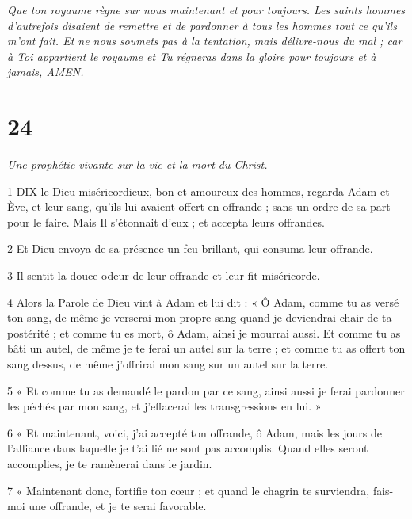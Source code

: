 \par \textit{Que ton royaume règne sur nous maintenant et pour toujours. Les saints hommes d’autrefois disaient de remettre et de pardonner à tous les hommes tout ce qu’ils m’ont fait. Et ne nous soumets pas à la tentation, mais délivre-nous du mal ; car à Toi appartient le royaume et Tu régneras dans la gloire pour toujours et à jamais, AMEN.}

\chapter{24}

\par \textit{Une prophétie vivante sur la vie et la mort du Christ.}

\par 1 DIX le Dieu miséricordieux, bon et amoureux des hommes, regarda Adam et Ève, et leur sang, qu'ils lui avaient offert en offrande ; sans un ordre de sa part pour le faire. Mais Il s’étonnait d’eux ; et accepta leurs offrandes.

\par 2 Et Dieu envoya de sa présence un feu brillant, qui consuma leur offrande.

\par 3 Il sentit la douce odeur de leur offrande et leur fit miséricorde.

\par 4 Alors la Parole de Dieu vint à Adam et lui dit : « Ô Adam, comme tu as versé ton sang, de même je verserai mon propre sang quand je deviendrai chair de ta postérité ; et comme tu es mort, ô Adam, ainsi je mourrai aussi. Et comme tu as bâti un autel, de même je te ferai un autel sur la terre ; et comme tu as offert ton sang dessus, de même j'offrirai mon sang sur un autel sur la terre.

\par 5 « Et comme tu as demandé le pardon par ce sang, ainsi aussi je ferai pardonner les péchés par mon sang, et j'effacerai les transgressions en lui. »

\par 6 « Et maintenant, voici, j'ai accepté ton offrande, ô Adam, mais les jours de l'alliance dans laquelle je t'ai lié ne sont pas accomplis. Quand elles seront accomplies, je te ramènerai dans le jardin.

\par 7 « Maintenant donc, fortifie ton cœur ; et quand le chagrin te surviendra, fais-moi une offrande, et je te serai favorable.

